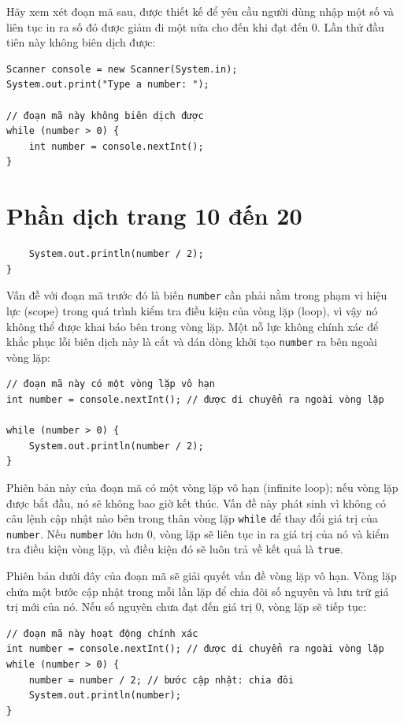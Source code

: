 Hãy xem xét đoạn mã sau, được thiết kế để yêu cầu người dùng nhập một số và liên tục in ra số đó được giảm đi một nửa cho đến khi đạt đến 0. Lần thử đầu tiên này không biên dịch được:

\begin{verbatim}
Scanner console = new Scanner(System.in);
System.out.print("Type a number: "); 
 
// đoạn mã này không biên dịch được
while (number > 0) {
    int number = console.nextInt();
}
\end{verbatim}
\section{Phần dịch trang 10 đến 20}
\begin{verbatim}
    System.out.println(number / 2);
}
\end{verbatim}

Vấn đề với đoạn mã trước đó là biến \texttt{number} cần phải nằm trong phạm vi hiệu lực (scope) trong quá trình kiểm tra điều kiện của vòng lặp (loop), vì vậy nó không thể được khai báo bên trong vòng lặp. Một nỗ lực không chính xác để khắc phục lỗi biên dịch này là cắt và dán dòng khởi tạo \texttt{number} ra bên ngoài vòng lặp:

\begin{verbatim}
// đoạn mã này có một vòng lặp vô hạn
int number = console.nextInt(); // được di chuyển ra ngoài vòng lặp 
 
while (number > 0) {
    System.out.println(number / 2);
}
\end{verbatim}

Phiên bản này của đoạn mã có một vòng lặp vô hạn (infinite loop); nếu vòng lặp được bắt đầu, nó sẽ không bao giờ kết thúc. Vấn đề này phát sinh vì không có câu lệnh cập nhật nào bên trong thân vòng lặp \texttt{while} để thay đổi giá trị của \texttt{number}. Nếu \texttt{number} lớn hơn 0, vòng lặp sẽ liên tục in ra giá trị của nó và kiểm tra điều kiện vòng lặp, và điều kiện đó sẽ luôn trả về kết quả là \texttt{true}.

Phiên bản dưới đây của đoạn mã sẽ giải quyết vấn đề vòng lặp vô hạn. Vòng lặp chứa một bước cập nhật trong mỗi lần lặp để chia đôi số nguyên và lưu trữ giá trị mới của nó. Nếu số nguyên chưa đạt đến giá trị 0, vòng lặp sẽ tiếp tục:

\begin{verbatim}
// đoạn mã này hoạt động chính xác
int number = console.nextInt(); // được di chuyển ra ngoài vòng lặp
while (number > 0) {
    number = number / 2; // bước cập nhật: chia đôi
    System.out.println(number);
}
\end{verbatim}

